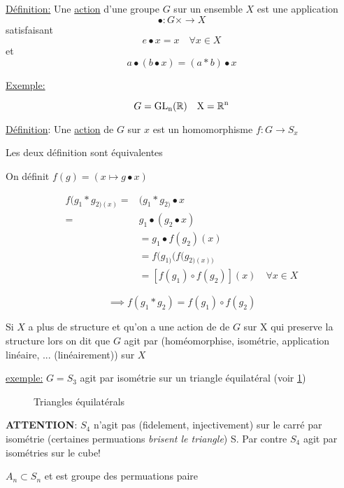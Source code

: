 \underline{Définition:} Une \underline{action} d'une groupe $G$ sur un ensemble $X$ est une application \[ \bullet  : G \times \to X  \]  satisfaisant \[ e \bullet x = x \quad \forall x \in X \] et \[ a \bullet (b \bullet x)  = (a * b) \bullet x \]

\underline{Exemple:}

\[ G = \rm{GL}_n (\mathbb{R})\quad X =\mathbb{R}^n \]

\underline{Définition}: Une \underline{action} de $G$ sur $x$ est un homomorphisme $f: G \to S_x$  

Les deux définition sont équivalentes

On définit $f(g) = (x \mapsto g \bullet x)$

\begin{align*}
	f(g_1 * g_{2)(x)} =& (g_1 * g_{2)} \bullet x\\ =& g_1 \bullet (g_2 \bullet x) \\&= g_1 \bullet f(g_2)(x) \\ &= f(g_{1)} (f(g_{2)(x))} \\&= \left[ f(g_1 ) \circ f(g_2 ) \right] (x )\quad \forall x \in X  
\end{align*}

\[ \implies f(g_1 * g_2) = f(g_1) \circ f(g_2 )\]

Si $X$ a plus de structure et qu'on a une action de de $G$ sur X qui preserve la structure lors on dit que $G$ agit par (homéomorphise, isométrie, application linéaire, ... (linéairement)) sur $X$

\underline{exemple:} $G = S_3 $ agit par isométrie sur un triangle équilatéral (voir \ref{fig:triangles-équilatérals})

\begin{figure}[ht]
    \centering
    \caption{Triangles équilatérals}
    \label{fig:triangles-équilatérals}
\end{figure}

\textbf{ATTENTION}: $S_4$ n'agit pas (fidelement, injectivement) sur le carré par isométrie (certaines permuations \textit{brisent le triangle}) S. Par contre $S_4$ agit par isométries sur le cube!




$A_n \subset S_n$ et est groupe des permuations paire

